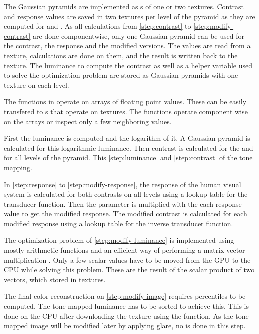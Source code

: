 The Gaussian pyramids are implemented as s of one or two textures.
Contrast and response values are saved in two textures per level of the pyramid as they are computed for \xdir{} and \ydirection{}.
As all calculations from \ref{step:contrast} to \ref{step:modify-contrast} are done componentwise, only one Gaussian pyramid can be used for the contrast, the response and the modified versions.
The values are read from a texture, calculations are done on them, and the result is written back to the texture.
The luminance to compute the contrast as well as a helper variable used to solve the optimization problem are stored as Gaussian pyramids with one texture on each level.

The functions in  operate on arrays of floating point values.
These can be easily transfered to \computeshader{}s that operate on textures.
The functions operate component wise on the arrays or inspect only a few neighboring values.

First the luminance is computed and the logarithm of it.
A Gaussian pyramid is calculated for this logarithmic luminance.
Then contrast is calculated for the \xdir{} and \ydirection{} for all levels of the pyramid.
This %
\ref{step:luminance} and \ref{step:contrast} of the tone mapping.

In \ref{step:response} to \ref{step:modify-response},
the response of the human visual system is calculated for both contrasts on all levels using a lookup table for the transducer function.
Then the parameter \parametertonemapping{} is multiplied with the each response value to get the modified response.
The modified contrast is calculated for each modified response using a lookup table for the inverse transducer function.

The optimization problem of \ref{step:modify-luminance} is implemented using mostly arithmetic functions and an efficient way of performing a matrix\hyp{}vector multiplication \cite[see][Section~7]{Mantiuk2006}.
Only a few scalar values have to be moved from the GPU to the CPU while solving this problem.
These are the result of the scalar product of two vectors, which stored in \twoD{} textures.

The final color reconstruction on \ref{step:modify-image} requires percentiles to be computed.
The tone mapped luminance has to be sorted to achieve this.
This is done on the CPU after downloading the texture using the  function.
As the tone mapped image will be modified later by applying glare, no  is done in this step.

